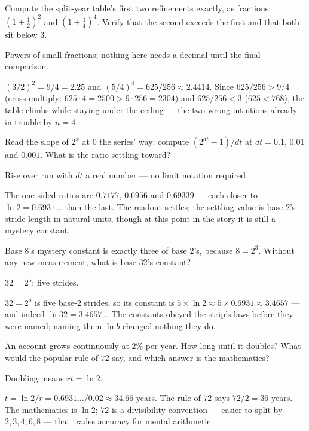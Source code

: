 \begin{problem}
Compute the split-year table's first two refinements exactly, as
fractions: $(1 + \tfrac12)^2$ and $(1 + \tfrac14)^4$. Verify that the
second exceeds the first and that both sit below $3$.
\begin{hint}
Powers of small fractions; nothing here needs a decimal until the
final comparison.
\end{hint}
\begin{solution}
$(3/2)^2 = 9/4 = 2.25$ and $(5/4)^4 = 625/256 \approx 2.4414$. Since
$625/256 > 9/4$ (cross-multiply: $625 \cdot 4 = 2500 > 9 \cdot 256 =
2304$) and $625/256 < 3$ ($625 < 768$), the table climbs while
staying under the ceiling — the two wrong intuitions already in
trouble by $n = 4$.
\end{solution}
\end{problem}

\begin{problem}
Read the slope of $2^x$ at $0$ the series' way: compute
$(2^{dt} - 1)/dt$ at $dt = 0.1$, $0.01$ and $0.001$. What is the
ratio settling toward?
\begin{hint}
Rise over run with $dt$ a real number — no limit notation required.
\end{hint}
\begin{solution}
The one-sided ratios are $0.7177$, $0.6956$ and $0.69339$ — each
closer to $\ln 2 = 0.6931\ldots$ than the last. The readout settles;
the settling value is base $2$'s stride length in natural units,
though at this point in the story it is still a mystery constant.
\end{solution}
\end{problem}

\begin{problem}
Base $8$'s mystery constant is exactly three of base $2$'s, because
$8 = 2^3$. Without any new measurement, what is base $32$'s
constant?
\begin{hint}
$32 = 2^5$: five strides.
\end{hint}
\begin{solution}
$32 = 2^5$ is five base-$2$ strides, so its constant is
$5 \times \ln 2 \approx 5 \times 0.6931 \approx 3.4657$ — and indeed
$\ln 32 = 3.4657\ldots$ The constants obeyed the strip's laws before
they were named; naming them $\ln b$ changed nothing they do.
\end{solution}
\end{problem}

\begin{problem}
An account grows continuously at $2\%$ per year. How long until it
doubles? What would the popular rule of $72$ say, and which answer is
the mathematics?
\begin{hint}
Doubling means $rt = \ln 2$.
\end{hint}
\begin{solution}
$t = \ln 2 / r = 0.6931\ldots/0.02 \approx 34.66$ years. The rule of
$72$ says $72/2 = 36$ years. The mathematics is $\ln 2$; $72$ is a
divisibility convention — easier to split by $2, 3, 4, 6, 8$ — that
trades accuracy for mental arithmetic.
\end{solution}
\end{problem}

